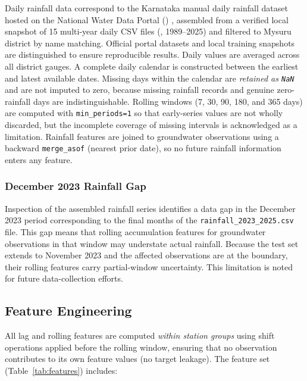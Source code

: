 \documentclass[conference]{IEEEtran}
\begin{document}
Daily rainfall data correspond to the Karnataka manual daily rainfall
dataset hosted on the National Water Data Portal
(\href{https://nwdp.nwic.gov.in/dataset/rainfall-manual-daily-karnataka}{})
\cite{nwdp_rainfall}, assembled from a verified local snapshot of 15
multi-year daily CSV files (, 1989--2025)
and filtered to Mysuru district by name matching.
Official portal datasets and local training snapshots are distinguished
to ensure reproducible results.
Daily values are averaged across all district gauges.
A complete daily calendar is constructed between the earliest and
latest available dates.
Missing days within the calendar are \emph{retained as
\texttt{NaN}} and are not imputed to zero, because missing rainfall
records and genuine zero-rainfall days are indistinguishable.
Rolling windows (7, 30, 90, 180, and 365 days) are computed with
\texttt{min\_periods=1} so that early-series values are not wholly
discarded, but the incomplete coverage of missing intervals is
acknowledged as a limitation.
Rainfall features are joined to groundwater observations using a
backward \texttt{merge\_asof} (nearest prior date), so no future
rainfall information enters any feature.

\subsubsection{December 2023 Rainfall Gap}
Inspection of the assembled rainfall series identifies a data gap in
the December 2023 period corresponding to the final months of the
\texttt{rainfall\_2023\_2025.csv} file.
This gap means that rolling accumulation features for groundwater
observations in that window may understate actual rainfall.
Because the test set extends to November 2023 and the affected
observations are at the boundary, their rolling features carry
partial-window uncertainty.
This limitation is noted for future data-collection efforts.

\subsection{Feature Engineering}
\label{sec:features}

All lag and rolling features are computed \emph{within station groups}
using shift operations applied before the rolling window, ensuring
that no observation contributes to its own feature values
(no target leakage).
The feature set (Table~\ref{tab:features}) includes:
\end{document}
